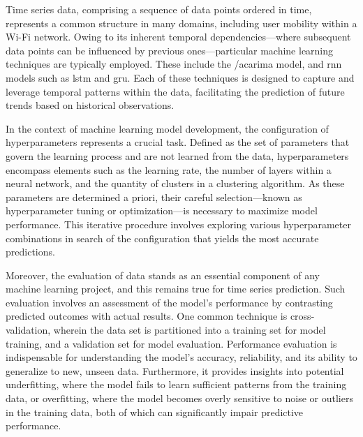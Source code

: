 Time series data, comprising a sequence of data points ordered in time, represents a common structure in many domains, including user mobility within a Wi-Fi network.
Owing to its inherent temporal dependencies—where subsequent data points can be influenced by previous ones—particular machine learning techniques are typically employed.
These include the /ac{arima} model, and \ac{rnn} models such as \ac{lstm} and \ac{gru}.
Each of these techniques is designed to capture and leverage temporal patterns within the data, facilitating the prediction of future trends based on historical observations.

In the context of machine learning model development, the configuration of hyperparameters represents a crucial task.
Defined as the set of parameters that govern the learning process and are not learned from the data, hyperparameters encompass elements such as the learning rate, the number of layers within a neural network, and the quantity of clusters in a clustering algorithm.
As these parameters are determined a priori, their careful selection—known as hyperparameter tuning or optimization—is necessary to maximize model performance.
This iterative procedure involves exploring various hyperparameter combinations in search of the configuration that yields the most accurate predictions.

Moreover, the evaluation of data stands as an essential component of any machine learning project, and this remains true for time series prediction.
Such evaluation involves an assessment of the model's performance by contrasting predicted outcomes with actual results.
One common technique is cross-validation, wherein the data set is partitioned into a training set for model training, and a validation set for model evaluation.
Performance evaluation is indispensable for understanding the model's accuracy, reliability, and its ability to generalize to new, unseen data.
Furthermore, it provides insights into potential underfitting, where the model fails to learn sufficient patterns from the training data, or overfitting, where the model becomes overly sensitive to noise or outliers in the training data, both of which can significantly impair predictive performance.


